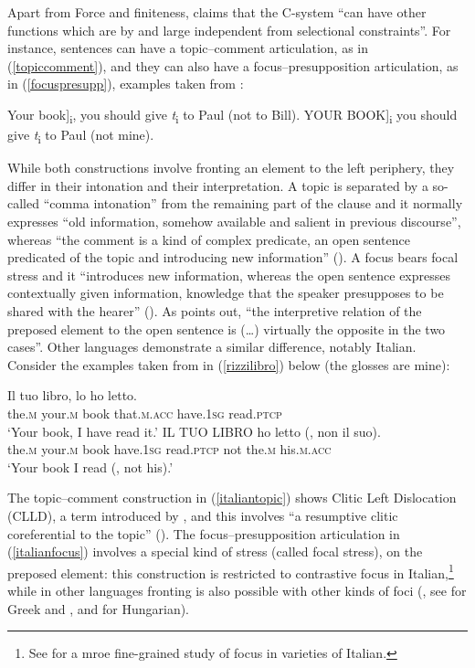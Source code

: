 Apart from Force and finiteness, \citet[285]{rizzi1997} claims that the C-system ``can have other functions which are by and large independent from selectional constraints''. For instance, sentences can have a topic--comment articulation, as in (\ref{topiccomment}), and they can also have a focus--presupposition articulation, as in (\ref{focuspresupp}), examples taken from \citet[285, ex. 1 and 2]{rizzi1997}:

\ea \label{englishrizzi}
\ea {[}Your book]\textsubscript{i}, you should give \textit{t}\textsubscript{i} to Paul (not to Bill). \label{topiccomment}
\ex {[}YOUR BOOK]\textsubscript{i} you should give \textit{t}\textsubscript{i} to Paul (not mine). \label{focuspresupp}
\z
\z

While both constructions involve fronting an element to the left periphery, they differ in their intonation and their interpretation. A topic is separated by a so-called ``comma intonation'' from the remaining part of the clause and it normally expresses ``old information, somehow available and salient in previous discourse'', whereas ``the comment is a kind of complex predicate, an open sentence predicated of the topic and introducing new information'' (\citealt[258]{rizzi1997}). A focus bears focal stress and it ``introduces new information, whereas the open sentence expresses contextually given information, knowledge that the speaker presupposes to be shared with the hearer'' (\citealt[258]{rizzi1997}). As \citet[258]{rizzi1997} points out, ``the interpretive relation of the preposed element to the open sentence is (\ldots) virtually the opposite in the two cases''. Other languages demonstrate a similar difference, notably Italian. Consider the examples taken from \citet[286, ex. 3 and 4]{rizzi1997} in (\ref{rizzilibro}) below (the glosses are mine):

\ea \label{rizzilibro}
\ea \gll Il tuo libro, lo ho letto. \label{italiantopic}\\
the.\textsc{m} your.\textsc{m} book that.\textsc{m.acc} have.\textsc{1sg} read.\textsc{ptcp}\\
\glt `Your book, I have read it.'
\ex \gll IL TUO LIBRO ho letto (, non il suo). \label{italianfocus}\\
the.\textsc{m} your.\textsc{m} book have.\textsc{1sg} read.\textsc{ptcp} {} not the.\textsc{m} his.\textsc{m.acc}\\
\glt `Your book I read (, not his).'
\z
\z

The topic--comment construction in (\ref{italiantopic}) shows Clitic Left Dislocation (CLLD), a term introduced by \citet{cinque1990}, and this involves ``a resumptive clitic coreferential to the topic'' (\citealt[285]{rizzi1997}). The focus--presupposition articulation in (\ref{italianfocus}) involves a special kind of stress (called focal stress), on the preposed element: this construction is restricted to contrastive focus in Italian,\footnote{See \citet{paoli2009} for a mroe fine-grained study of focus in varieties of Italian.} while in other languages fronting is also possible with other kinds of foci (\citealt[286]{rizzi1997}, see \citealt{tsimpli1995} for Greek and \citealt{horvath1986}, \citealt{ekiss1987} and \citealt{brody1990} for Hungarian).

